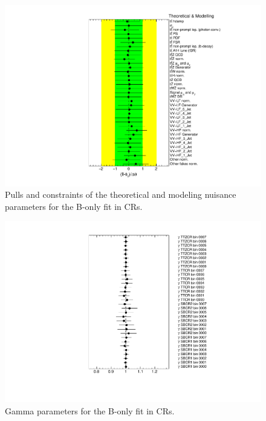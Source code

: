 \begin{figure}[htbp]
	\centering
	\includegraphics[width=.85\textwidth]{Chapters/CH7/figures/BONLY_CR_UsingDL1rcFullSys/NuisPar_Theoretical_&_Modelling}
	\caption{Pulls and constraints of the theoretical and modeling nuisance parameters for the B-only \tZc fit in CRs.}%
	\label{fig:stat:tzc:bonly:cr:np:model}
\end{figure}

\begin{figure}[htbp]
	\centering
	\includegraphics[width=.85\textwidth]{Chapters/CH7/figures/BONLY_CR_UsingDL1rcFullSys/Gammas}
	\caption{Gamma parameters for the B-only \tZc fit in CRs.}%
	\label{fig:stat:tzc:bonly:cr:gamma}
\end{figure}

